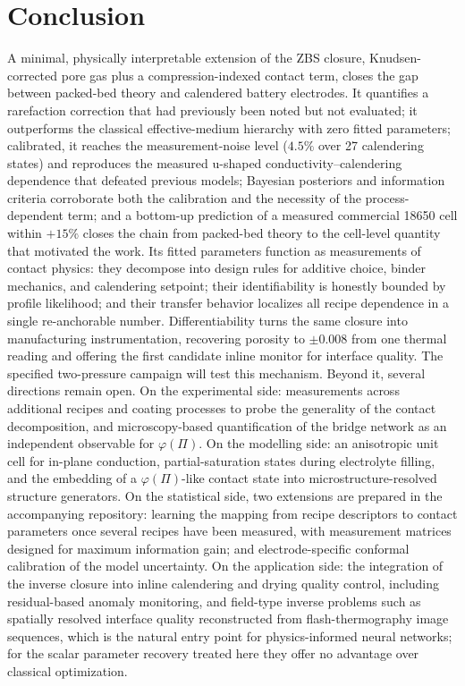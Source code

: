 \documentclass[10pt,a4paper]{article}
\begin{document}
\section{Conclusion}
\label{sec:conclusion}

A minimal, physically interpretable extension of the ZBS closure, Knudsen-corrected pore gas plus a compression-indexed contact term, closes the gap between packed-bed theory and calendered battery electrodes. It quantifies a rarefaction correction that had previously been noted but not evaluated; it outperforms the classical effective-medium hierarchy with zero fitted parameters; calibrated, it reaches the measurement-noise level ($4.5\%$ over 27 calendering states) and reproduces the measured u-shaped conductivity--calendering dependence that defeated previous models; Bayesian posteriors and information criteria corroborate both the calibration and the necessity of the process-dependent term; and a bottom-up prediction of a measured commercial 18650 cell within $+15\%$ closes the chain from packed-bed theory to the cell-level quantity that motivated the work. Its fitted parameters function as measurements of contact physics: they decompose into design rules for additive choice, binder mechanics, and calendering setpoint; their identifiability is honestly bounded by profile likelihood; and their transfer behavior localizes all recipe dependence in a single re-anchorable number. Differentiability turns the same closure into manufacturing instrumentation, recovering porosity to $\pm0.008$ from one thermal reading and offering the first candidate inline monitor for interface quality. The specified two-pressure campaign will test this mechanism. Beyond it, several directions remain open. On the experimental side: measurements across additional recipes and coating processes to probe the generality of the contact decomposition, and microscopy-based quantification of the bridge network as an independent observable for $\varphi(\Pi)$. On the modelling side: an anisotropic unit cell for in-plane conduction, partial-saturation states during electrolyte filling, and the embedding of a $\varphi(\Pi)$-like contact state into microstructure-resolved structure generators. On the statistical side, two extensions are prepared in the accompanying repository: learning the mapping from recipe descriptors to contact parameters once several recipes have been measured, with measurement matrices designed for maximum information gain; and electrode-specific conformal calibration of the model uncertainty. On the application side: the integration of the inverse closure into inline calendering and drying quality control, including residual-based anomaly monitoring, and field-type inverse problems such as spatially resolved interface quality reconstructed from flash-thermography image sequences, which is the natural entry point for physics-informed neural networks; for the scalar parameter recovery treated here they offer no advantage over classical optimization.
\end{document}
